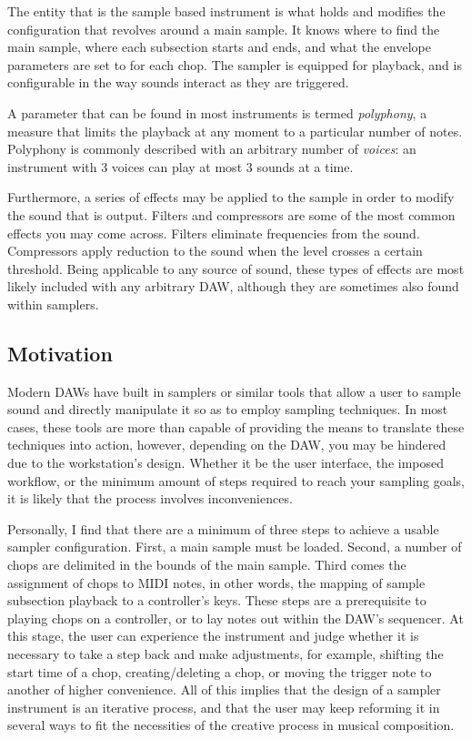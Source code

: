 \documentclass[12pt, a4paper, hidelinks]{article}
\begin{document}
 	The entity that is the sample based instrument is what holds and modifies the configuration that revolves around a main sample. It knows where to find the main sample, where each subsection starts and ends, and what the envelope parameters are set to for each chop. The sampler is equipped for playback, and is configurable in the way sounds interact as they are triggered. \par 
 	A parameter that can be found in most instruments is termed \textit{polyphony}, a measure that limits the playback at any moment to a particular number of notes. Polyphony is commonly described with an arbitrary number of \textit{voices}: an instrument with 3 voices can play at most 3 sounds at a time.\par
 	Furthermore, a series of effects may be applied to the sample in order to modify the sound that is output. Filters and compressors are some of the most common effects you may come across. Filters eliminate frequencies from the sound. Compressors apply reduction to the sound when the level crosses a certain threshold. Being applicable to any source of sound, these types of effects are most likely included with any arbitrary DAW, although they are sometimes also found within samplers.

	
	\newpage
	\subsection{Motivation}
	Modern DAWs have built in samplers or similar tools that allow a user to sample sound and directly manipulate it so as to employ sampling techniques. In most cases, these tools are more than capable of providing the means to translate these techniques into action, however, depending on the DAW, you may be hindered due to the workstation's design. Whether it be the user interface, the imposed workflow, or the minimum amount of steps required to reach your sampling goals, it is likely that the process involves inconveniences.\par
	 
	Personally, I find that there are a minimum of three steps to achieve a usable sampler configuration. First, a main sample must be loaded. Second, a number of chops are delimited in the bounds of the main sample. Third comes the assignment of chops to MIDI notes, in other words, the mapping of sample subsection playback to a controller's keys. These steps are a prerequisite to playing chops on a controller, or to lay notes out within the DAW's sequencer. At this stage, the user can experience the instrument and judge whether it is necessary to take a step back and make adjustments, for example, shifting the start time of a chop, creating/deleting a chop, or moving the trigger note to another of higher convenience. All of this implies that the design of a sampler instrument is an iterative process, and that the user may keep reforming it in several ways to fit the necessities of the creative process in musical composition. \par 
	
\end{document}
